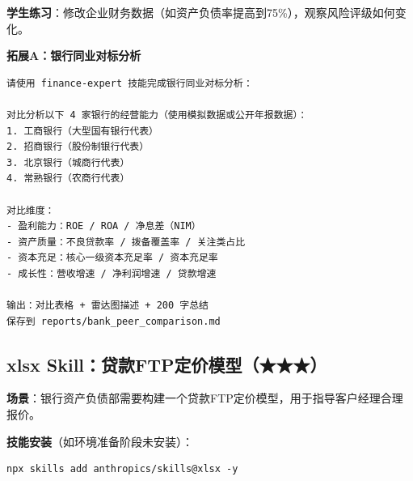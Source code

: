 \textbf{学生练习}：修改企业财务数据（如资产负债率提高到75\%），观察风险评级如何变化。

\textbf{拓展A：银行同业对标分析}

\begin{lstlisting}
请使用 finance-expert 技能完成银行同业对标分析：

对比分析以下 4 家银行的经营能力（使用模拟数据或公开年报数据）：
1. 工商银行（大型国有银行代表）
2. 招商银行（股份制银行代表）
3. 北京银行（城商行代表）
4. 常熟银行（农商行代表）

对比维度：
- 盈利能力：ROE / ROA / 净息差（NIM）
- 资产质量：不良贷款率 / 拨备覆盖率 / 关注类占比
- 资本充足：核心一级资本充足率 / 资本充足率
- 成长性：营收增速 / 净利润增速 / 贷款增速

输出：对比表格 + 雷达图描述 + 200 字总结
保存到 reports/bank_peer_comparison.md
\end{lstlisting}

\subsection{xlsx Skill：贷款FTP定价模型（★★★）}

\textbf{场景}：银行资产负债部需要构建一个贷款FTP定价模型，用于指导客户经理合理报价。

\textbf{技能安装}（如环境准备阶段未安装）：

\begin{lstlisting}[style=shell]
npx skills add anthropics/skills@xlsx -y
\end{lstlisting}

